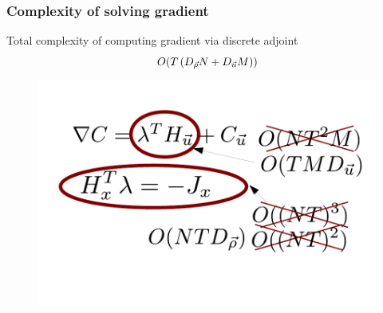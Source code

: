 \begin{frame}[t]\frametitle{Complexity of solving gradient}
    
\begin{block}{Total complexity of computing gradient via discrete adjoint}
\[
O(T\left(D_{\vec{\rho}}N+D_{\vec{u}}M\right))
\]
\end{block}

\begin{figure}
\includegraphics[width=.8\columnwidth]{figs-gen/complexity}
\end{figure}
\end{frame}



